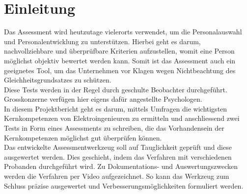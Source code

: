 
\chapter{Einleitung}

Das Assessment wird heutzutage vielerorts verwendet, um die Personalauswahl und Personalentwicklung zu unterstützen. Hierbei geht es darum, nachvollziehbare und überprüfbare Kriterien aufzustellen, womit eine Person möglichst objektiv bewertet werden kann. Somit ist das Assessment auch ein geeignetes Tool, um das Unternehmen vor Klagen wegen Nichtbeachtung des Gleichheitsgrundsatzes zu schützen. \\ 
Diese Tests werden in der Regel durch geschulte Beobachter durchgeführt. Grosskonzerne verfügen hier eigens dafür angestellte Psychologen. \\
In diesem Projektbericht geht es darum, mittels Umfragen die wichtigsten Kernkompetenzen von Elektroingenieuren zu ermitteln und anschliessend zwei Tests in Form eines Assessments zu schreiben, die das Vorhandensein der Kernkompetenzen möglichst gut überprüfen können. \\
Das entwickelte Assessmentwerkzeug soll auf Tauglichkeit geprüft und diese ausgewertet werden. Dies geschieht, indem das Verfahren mit verschiedenen Probanden durchgeführt wird. Zu Dokumentations- und Auswertungszwecken werden die Verfahren per Video aufgezeichnet. So kann das Werkzeug zum Schluss präzise ausgewertet und Verbesserungsmöglichkeiten formuliert werden.
  

